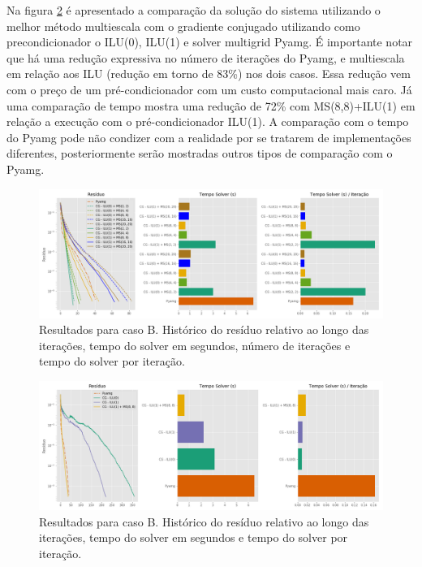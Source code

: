 Na figura \ref{fig:reservatorio320x320_2} é apresentado a comparação da solução do sistema utilizando o melhor método multiescala com o gradiente conjugado utilizando como precondicionador o ILU(0), ILU(1) e solver multigrid Pyamg. É importante notar que há uma redução expressiva no número de iterações do Pyamg, e multiescala em relação aos ILU (redução em torno de 83\%) nos dois casos. Essa redução vem com o preço de um pré-condicionador com um custo computacional mais caro. Já uma comparação de tempo mostra uma redução de 72\% com MS(8,8)+ILU(1) em relação a execução com o pré-condicionador ILU(1). A comparação com o tempo do Pyamg pode não condizer com a realidade por se tratarem de implementações diferentes, posteriormente serão mostradas outros tipos de comparação com o Pyamg.

\begin{figure}[!htbp]
\centering
\includegraphics[width=\textwidth]{chap08/figs/reservatorio320x320_1.png}
\caption{Resultados para caso B. Histórico do resíduo relativo ao longo das iterações, tempo do solver em segundos, número de iterações e tempo do solver por iteração. }
\label{fig:reservatorio320x320_1} 
\end{figure}


\begin{figure}[!htbp]
\centering
\includegraphics[width=\textwidth]{chap08/figs/reservatorio320x320_2.png}
\caption{Resultados para caso B. Histórico do resíduo relativo ao longo das iterações, tempo do solver em segundos e tempo do solver por iteração. }
\label{fig:reservatorio320x320_2}
\end{figure}


